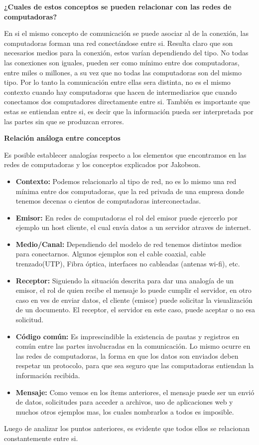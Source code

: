 \documentclass[a4paper,12pt,titlepage]{article} %
\begin{document}
{\Large \textbf{¿Cuales de estos conceptos se pueden relacionar con las redes de computadoras?}}\newline

En si el mismo concepto de comunicación se puede asociar al de la conexión, las computadoras forman una red conectándose entre si. Resulta claro que son necesarios medios para la conexión, estos varían dependiendo del tipo. No todas las conexiones son iguales, pueden ser como mínimo entre dos computadoras, entre miles o millones, a su vez que no todas las computadoras son del mismo tipo. Por lo tanto la comunicación entre ellas sera distinta, no es el mismo contexto cuando hay computadoras que hacen de intermediarios que cuando conectamos dos computadores directamente entre si. También es importante que estas se entiendan entre si, es decir que la información pueda ser interpretada por las partes sin que se produzcan errores.

\newpage

{\Large \textbf{Relación análoga entre conceptos}}\newline

Es posible establecer analogías respecto a los elementos que encontramos en las redes de computadoras y los conceptos explicados por Jakobson.

\begin{itemize}
\item \textbf{Contexto:} Podemos relacionarlo al tipo de red, no es lo mismo una red mínima entre dos computadoras, que la red privada de una empresa donde tenemos decenas o cientos de computadoras interconectadas.
\item \textbf{Emisor:} En redes de computadoras el rol del emisor puede ejercerlo por ejemplo un host cliente, el cual envía datos a un servidor atraves de internet.
\item \textbf{Medio/Canal:} Dependiendo del modelo de red tenemos distintos medios para conectarnos. Algunos ejemplos son el cable coaxial, cable trenzado(UTP), Fibra óptica, interfaces no cableadas (antenas wi-fi), etc.
\item \textbf{Receptor:} Siguiendo la situación descrita para dar una analogía de un emisor, el rol de quien recibe el mensaje lo puede cumplir el servidor, en otro caso en ves de enviar datos, el cliente (emisor) puede solicitar la visualización de un documento. El receptor, el servidor en este caso, puede aceptar o no esa solicitud.
\item \textbf{Código común:} Es imprescindible la existencia de pautas y registros en común entre las partes involucradas en la comunicación. Lo mismo ocurre en las redes de computadoras, la forma en que los datos son enviados deben respetar un protocolo, para que sea seguro que las computadoras entiendan la información recibida.     
\item \textbf{Mensaje:} Como vemos en los ítems anteriores, el mensaje puede ser un envió de datos, solicitudes para acceder a archivos, uso de aplicaciones web y muchos otros ejemplos mas, los cuales nombrarlos a todos es imposible.  
\end{itemize}

Luego de analizar los puntos anteriores, es evidente que todos ellos se relacionan constantemente entre si. 
\end{document}
